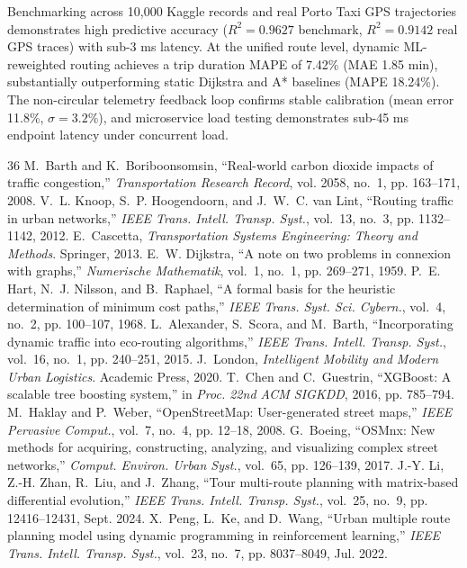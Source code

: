 \documentclass[journal]{IEEEtran}
\begin{document}
Benchmarking across 10,000 Kaggle records and real Porto Taxi GPS trajectories demonstrates high predictive accuracy ($R^2 = 0.9627$ benchmark, $R^2 = 0.9142$ real GPS traces) with sub-3 ms latency. At the unified route level, dynamic ML-reweighted routing achieves a trip duration MAPE of 7.42\% (MAE 1.85 min), substantially outperforming static Dijkstra and A* baselines (MAPE 18.24\%). The non-circular telemetry feedback loop confirms stable calibration (mean error 11.8\%, $\sigma=3.2\%$), and microservice load testing demonstrates sub-45 ms endpoint latency under concurrent load.

\begin{thebibliography}{36}
 M.~Barth and K.~Boriboonsomsin, ``Real-world carbon dioxide impacts of traffic congestion,'' \emph{Transportation Research Record}, vol. 2058, no.~1, pp. 163--171, 2008.
 V.~L. Knoop, S.~P. Hoogendoorn, and J.~W.~C. van Lint, ``Routing traffic in urban networks,'' \emph{IEEE Trans. Intell. Transp. Syst.}, vol.~13, no.~3, pp. 1132--1142, 2012.
 E.~Cascetta, \emph{Transportation Systems Engineering: Theory and Methods}. Springer, 2013.
 E.~W. Dijkstra, ``A note on two problems in connexion with graphs,'' \emph{Numerische Mathematik}, vol.~1, no.~1, pp. 269--271, 1959.
 P.~E. Hart, N.~J. Nilsson, and B.~Raphael, ``A formal basis for the heuristic determination of minimum cost paths,'' \emph{IEEE Trans. Syst. Sci. Cybern.}, vol.~4, no.~2, pp. 100--107, 1968.
 L.~Alexander, S.~Scora, and M.~Barth, ``Incorporating dynamic traffic into eco-routing algorithms,'' \emph{IEEE Trans. Intell. Transp. Syst.}, vol.~16, no.~1, pp. 240--251, 2015.
 J.~London, \emph{Intelligent Mobility and Modern Urban Logistics}. Academic Press, 2020.
 T.~Chen and C.~Guestrin, ``XGBoost: A scalable tree boosting system,'' in \emph{Proc. 22nd ACM SIGKDD}, 2016, pp. 785--794.
 M.~Haklay and P.~Weber, ``OpenStreetMap: User-generated street maps,'' \emph{IEEE Pervasive Comput.}, vol.~7, no.~4, pp. 12--18, 2008.
 G.~Boeing, ``OSMnx: New methods for acquiring, constructing, analyzing, and visualizing complex street networks,'' \emph{Comput. Environ. Urban Syst.}, vol.~65, pp. 126--139, 2017.
 J.-Y. Li, Z.-H. Zhan, R.~Liu, and J.~Zhang, ``Tour multi-route planning with matrix-based differential evolution,'' \emph{IEEE Trans. Intell. Transp. Syst.}, vol.~25, no.~9, pp. 12416--12431, Sept. 2024.
 X.~Peng, L.~Ke, and D.~Wang, ``Urban multiple route planning model using dynamic programming in reinforcement learning,'' \emph{IEEE Trans. Intell. Transp. Syst.}, vol.~23, no.~7, pp. 8037--8049, Jul. 2022.

\end{thebibliography}
\end{document}
